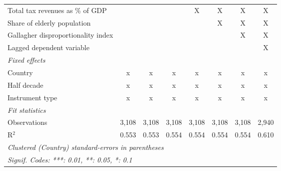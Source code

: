 \begin{table}[htbp]
\begin{tabular}{lccccccc}
      Total tax revenues as \% of GDP                                         &              &              &              & X            & X            & X            & X\\  
      Share of elderly population                                             &              &              &              &              & X            & X            & X\\  
      Gallagher disproportionality index                                      &              &              &              &              &              & X            & X\\  
      Lagged dependent variable                                               &              &              &              &              &              &              & X\\  
      \emph{Fixed effects}\\
      Country                                                                 & x            & x            & x            & x            & x            & x            & x\\  
      Half decade                                                             & x            & x            & x            & x            & x            & x            & x\\  
      Instrument type                                                         & x            & x            & x            & x            & x            & x            & x\\  
      \midrule \emph{Fit statistics}\\
      Observations                                                            & 3,108        & 3,108        & 3,108        & 3,108        & 3,108        & 3,108        & 2,940\\  
      R$^2$                                                                   & 0.553        & 0.553        & 0.554        & 0.554        & 0.554        & 0.554        & 0.610\\  
      \midrule
      \multicolumn{8}{l}{\emph{Clustered (Country) standard-errors in parentheses}}\\
      \multicolumn{8}{l}{\emph{Signif. Codes: ***: 0.01, **: 0.05, *: 0.1}}\\
   \end{tabular}
\end{table}


